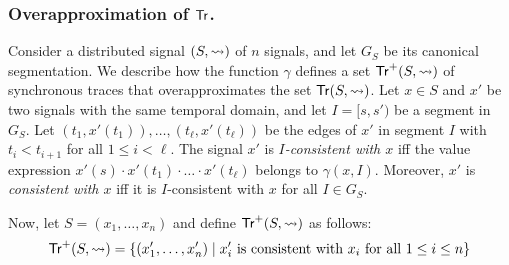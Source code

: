 \subsubsection{Overapproximation of $\mathsf{Tr}$.}
Consider a distributed signal $(S,{\rightsquigarrow})$ of $n$ signals, and let $G_S$ be its canonical segmentation.
We describe how the function $\gamma$ defines a set $\mathsf{Tr}^+(S,{\rightsquigarrow})$ of synchronous traces that overapproximates the set $\mathsf{Tr}(S,{\rightsquigarrow})$.
%
%
%
Let $x \in S$ and $x'$ be two signals with the same temporal domain, and let $I = [s, s')$ be a segment in $G_S$.
Let $(t_1, x'(t_1)), \ldots, (t_\ell, x'(t_\ell))$ be the edges of $x'$ in segment $I$ with $t_i < t_{i+1}$ for all $1 \leq i < \ell$.
The signal $x'$ is \emph{$I$-consistent with $x$} iff the value expression $x'(s) \cdot x'(t_1) \cdot \ldots \cdot x'(t_\ell)$ belongs to $\gamma(x,I)$.
Moreover, $x'$ is \emph{consistent with $x$} iff it is $I$-consistent with $x$ for all $I \in G_S$.

Now, let $S = (x_1, \ldots, x_n)$ and define $\mathsf{Tr}^+(S,{\rightsquigarrow})$ as follows:
\[ \tr^+(S,{\hb}) = \{ (x_1', \ldots, x_n') \st \text{$x_i'$ is consistent with $x_i$ for all $1 \leq i \leq n$}\} \]



